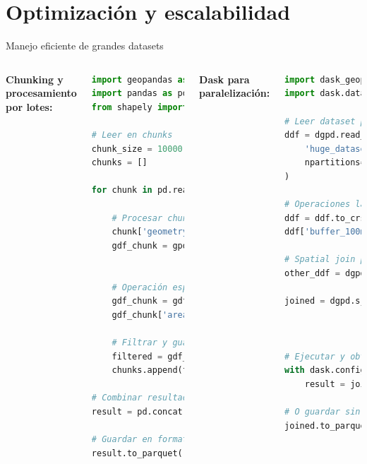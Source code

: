 \documentclass[10pt,aspectratio=169]{beamer}
\begin{document}
\section{Optimización y escalabilidad}

\begin{frame}[fragile]{Manejo eficiente de grandes datasets}
    \begin{columns}[T]
        \textbf{Chunking y procesamiento por lotes:}
        \begin{lstlisting}[language=Python]
import geopandas as gpd
import pandas as pd
from shapely import wkt

# Leer en chunks
chunk_size = 10000
chunks = []

for chunk in pd.read_csv('huge_dataset.csv', 
                         chunksize=chunk_size):
    # Procesar chunk
    chunk['geometry'] = chunk['wkt'].apply(wkt.loads)
    gdf_chunk = gpd.GeoDataFrame(chunk, 
                                 crs='EPSG:4326')
    
    # Operación espacial en chunk
    gdf_chunk = gdf_chunk.to_crs('EPSG:32719')
    gdf_chunk['area'] = gdf_chunk.area
    
    # Filtrar y guardar resultado
    filtered = gdf_chunk[gdf_chunk['area'] > 1000]
    chunks.append(filtered)

# Combinar resultados
result = pd.concat(chunks, ignore_index=True)

# Guardar en formato eficiente
result.to_parquet('processed_data.parquet')
        \end{lstlisting}
        
        \textbf{Dask para paralelización:}
        \begin{lstlisting}[language=Python]
import dask_geopandas as dgpd
import dask.dataframe as dd

# Leer dataset particionado
ddf = dgpd.read_parquet(
    'huge_dataset.parquet',
    npartitions=8
)

# Operaciones lazy (no se ejecutan aún)
ddf = ddf.to_crs('EPSG:32719')
ddf['buffer_100m'] = ddf.buffer(100)

# Spatial join paralelo
other_ddf = dgpd.read_file('polygons.gpkg', 
                          npartitions=4)
joined = dgpd.sjoin(ddf, other_ddf, 
                    how='inner', 
                    predicate='intersects')

# Ejecutar y obtener resultado
with dask.config.set(scheduler='threads'):
    result = joined.compute()

# O guardar sin cargar en memoria
joined.to_parquet('joined_results/')
        \end{lstlisting}
    \end{columns}
\end{frame}
\end{document}
